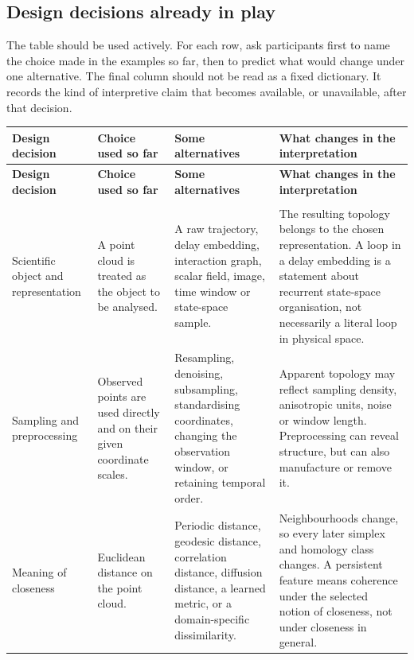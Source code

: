 \documentclass[11pt,a4paper]{article}
\newcommand{\planningbox}[2]{%
\subsection*{#1}
#2
}
\begin{document}
\planningbox{Design decisions already in play}{
The table should be used actively. For each row, ask participants first to name
the choice made in the examples so far, then to predict what would change under
one alternative. The final column should not be read as a fixed dictionary. It
records the kind of interpretive claim that becomes available, or unavailable,
after that decision.

\begingroup
\small
\renewcommand{\arraystretch}{1.22}
\begin{longtable}{@{}>{\raggedright\arraybackslash}p{0.16\textwidth}
                    >{\raggedright\arraybackslash}p{0.20\textwidth}
                    >{\raggedright\arraybackslash}p{0.25\textwidth}
                    >{\raggedright\arraybackslash}p{0.30\textwidth}@{}}
\toprule
\textbf{Design decision} &
\textbf{Choice used so far} &
\textbf{Some alternatives} &
\textbf{What changes in the interpretation} \\
\midrule
\endfirsthead
\toprule
\textbf{Design decision} &
\textbf{Choice used so far} &
\textbf{Some alternatives} &
\textbf{What changes in the interpretation} \\
\midrule
\endhead
\midrule
\multicolumn{4}{r}{\small\itshape Continued on next page}\\
\endfoot
\bottomrule
\endlastfoot

Scientific object and representation
& A point cloud is treated as the object to be analysed.
& A raw trajectory, delay embedding, interaction graph, scalar field, image,
  time window or state-space sample.
& The resulting topology belongs to the chosen representation. A loop in a
  delay embedding is a statement about recurrent state-space organisation, not
  necessarily a literal loop in physical space. \\

Sampling and preprocessing
& Observed points are used directly and on their given coordinate scales.
& Resampling, denoising, subsampling, standardising coordinates, changing the
  observation window, or retaining temporal order.
& Apparent topology may reflect sampling density, anisotropic units, noise or
  window length. Preprocessing can reveal structure, but can also manufacture
  or remove it. \\

Meaning of closeness
& Euclidean distance on the point cloud.
& Periodic distance, geodesic distance, correlation distance, diffusion
  distance, a learned metric, or a domain-specific dissimilarity.
& Neighbourhoods change, so every later simplex and homology class changes. A
  persistent feature means coherence under the selected notion of closeness,
  not under closeness in general. \\


\end{longtable}}
\end{document}
